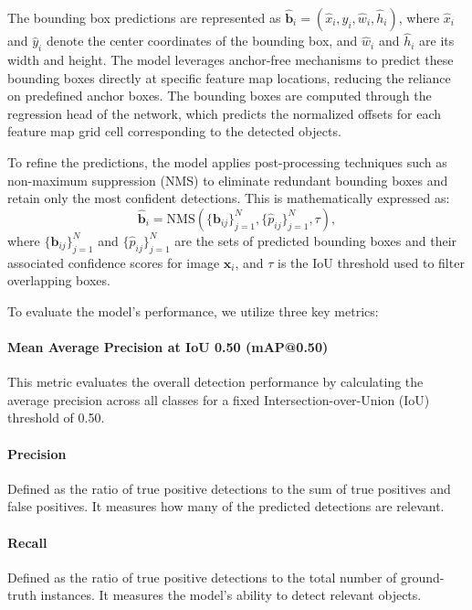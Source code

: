The bounding box predictions are represented as $\hat{\mathbf{b}}_i = (\hat{x}_i, \hat{y}_i, \hat{w}_i, \hat{h}_i)$, where $\hat{x}_i$ and $\hat{y}_i$ denote the center coordinates of the bounding box, and $\hat{w}_i$ and $\hat{h}_i$ are its width and height. The model leverages anchor-free mechanisms to predict these bounding boxes directly at specific feature map locations, reducing the reliance on predefined anchor boxes. The bounding boxes are computed through the regression head of the network, which predicts the normalized offsets for each feature map grid cell corresponding to the detected objects.

To refine the predictions, the model applies post-processing techniques such as non-maximum suppression (NMS) to eliminate redundant bounding boxes and retain only the most confident detections. This is mathematically expressed as:
\begin{equation}
    \hat{\mathbf{b}}_i = \text{NMS}(\{\mathbf{b}_{ij}\}_{j=1}^N, \{\hat{p}_{ij}\}_{j=1}^N, \tau),
\end{equation}
where $\{\mathbf{b}_{ij}\}_{j=1}^N$ and $\{\hat{p}_{ij}\}_{j=1}^N$ are the sets of predicted bounding boxes and their associated confidence scores for image $\mathbf{x}_i$, and $\tau$ is the IoU threshold used to filter overlapping boxes.

To evaluate the model's performance, we utilize three key metrics:
\paragraph{Mean Average Precision at IoU 0.50 (mAP@0.50)} This metric evaluates the overall detection performance by calculating the average precision across all classes for a fixed Intersection-over-Union (IoU) threshold of 0.50.
\paragraph{Precision} Defined as the ratio of true positive detections to the sum of true positives and false positives. It measures how many of the predicted detections are relevant.
\begin{comment}{
    \begin{equation}
        \text{Precision} = \frac{\text{True Positives}}{\text{True Positives} + \text{False Positives}}.
    \end{equation}}
\end{comment}
\paragraph{Recall} Defined as the ratio of true positive detections to the total number of ground-truth instances. It measures the model's ability to detect relevant objects.
\begin{comment}
    \begin{equation}
        \text{Recall} = \frac{\text{True Positives}}{\text{True Positives} + \text{False Negatives}}.
    \end{equation}
\end{comment}
    

